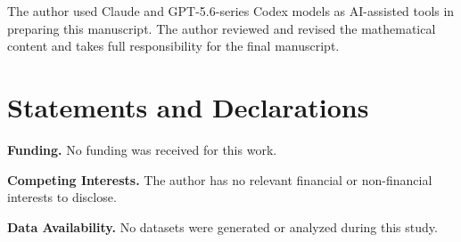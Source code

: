\documentclass[11pt]{amsart}
\theoremstyle{plain}
\theoremstyle{definition}
\theoremstyle{remark}
\begin{document}
The author used Claude and GPT-5.6-series Codex models as AI-assisted tools in preparing this manuscript. The author reviewed and revised the mathematical content and takes full responsibility for the final manuscript.

\section*{Statements and Declarations}

\noindent\textbf{Funding.}
No funding was received for this work.

\medskip
\noindent\textbf{Competing Interests.}
The author has no relevant financial or non-financial interests to disclose.

\medskip
\noindent\textbf{Data Availability.}
No datasets were generated or analyzed during this study.
\end{document}
